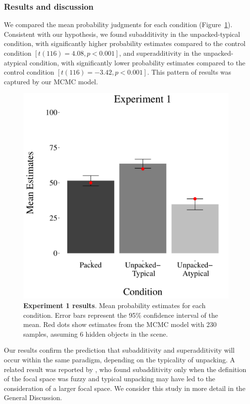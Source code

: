 \subsubsection{Results and discussion}
We compared the mean probability judgments for each condition (Figure~\ref{fig:results1}). Consistent with our hypothesis, we found subadditivity in the unpacked-typical condition, with significantly higher probability estimates compared to the control condition $[t(116) = 4.08, p<0.001]$, and superadditivity in the unpacked-atypical condition, with significantly lower probability estimates compared to the control condition $[t(116) = -3.42, p<0.001]$. This pattern of results was captured by our MCMC model.

\begin{figure}[ht!]
\centering
\includegraphics[scale=0.5]{figures/estimates.pdf}
\caption{\textbf{Experiment 1 results}. Mean probability estimates for each condition. Error bars represent the 95\% confidence interval of the mean. Red dots show estimates from the MCMC model with 230 samples, assuming 6 hidden objects in the scene.}
\label{fig:results1}
\end{figure}

Our results confirm the prediction that subadditivity and superadditivity will occur within the same paradigm, depending on the typicality of unpacking. A related result was reported by \cite{super}, who found subadditivity only when the definition of the focal space was fuzzy and typical unpacking may have led to the consideration of a larger focal space. We consider this study in more detail in the General Discussion.


